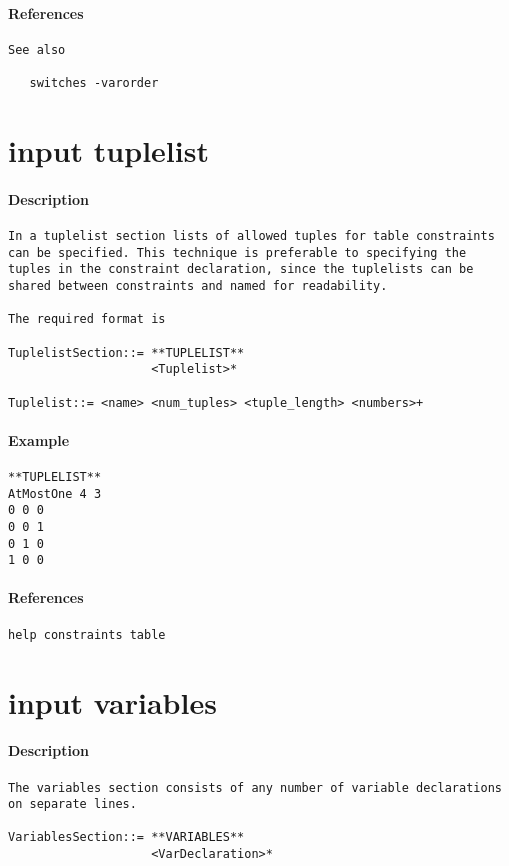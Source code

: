 \paragraph{References}
{\footnotesize
\begin{verbatim}
See also

   switches -varorder
\end{verbatim}
}
\section{input tuplelist}
\paragraph{Description}
{\footnotesize
\begin{verbatim}
In a tuplelist section lists of allowed tuples for table constraints
can be specified. This technique is preferable to specifying the
tuples in the constraint declaration, since the tuplelists can be
shared between constraints and named for readability.

The required format is

TuplelistSection::= **TUPLELIST**
                    <Tuplelist>*

Tuplelist::= <name> <num_tuples> <tuple_length> <numbers>+
\end{verbatim}
}
\paragraph{Example}
{\footnotesize
\begin{verbatim}
**TUPLELIST**
AtMostOne 4 3
0 0 0
0 0 1
0 1 0
1 0 0
\end{verbatim}
}
\paragraph{References}
{\footnotesize
\begin{verbatim}
help constraints table
\end{verbatim}
}
\section{input variables}
\paragraph{Description}
{\footnotesize
\begin{verbatim}
The variables section consists of any number of variable declarations
on separate lines.

VariablesSection::= **VARIABLES**
                    <VarDeclaration>*
\end{verbatim}
}
